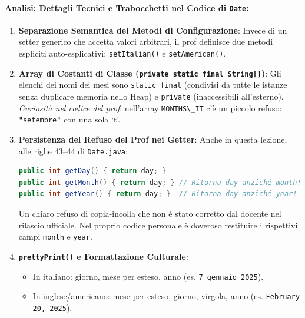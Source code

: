 \documentclass[11pt,a4paper]{article}
\newcommand{\passthrough}[1]{#1}
\providecommand{\tightlist}{\setlength{\itemsep}{0pt}\setlength{\parskip}{0pt}}
\begin{document}
\paragraph{\texorpdfstring{Analisi: Dettagli Tecnici e Trabocchetti nel
Codice di
\texttt{Date}:}{Analisi: Dettagli Tecnici e Trabocchetti nel Codice di Date:}}\label{analisi-dettagli-tecnici-e-trabocchetti-nel-codice-di-date}

\begin{enumerate}
\def\labelenumi{\arabic{enumi}.}
\item
  \textbf{Separazione Semantica dei Metodi di Configurazione}: Invece di
  un setter generico che accetta valori arbitrari, il prof definisce due
  metodi espliciti auto-esplicativi:
  \passthrough{\lstinline!setItalian()!} e
  \passthrough{\lstinline!setAmerican()!}.
\item
  \textbf{Array di Costanti di Classe
  (\passthrough{\lstinline!private static final String[]!})}: Gli
  elenchi dei nomi dei mesi sono \passthrough{\lstinline!static final!}
  (condivisi da tutte le istanze senza duplicare memoria nello Heap) e
  \passthrough{\lstinline!private!} (inaccessibili all'esterno).
  \emph{Curiosità nel codice del prof}: nell'array
  \passthrough{\lstinline!MONTHS\_IT!} c'è un piccolo refuso:
  \passthrough{\lstinline!"setembre"!} con una sola `t'.
\item
  \textbf{Persistenza del Refuso del Prof nei Getter}: Anche in questa
  lezione, alle righe 43--44 di \passthrough{\lstinline!Date.java!}:

\begin{lstlisting}[language=Java]
public int getDay() { return day; }
public int getMonth() { return day; } // Ritorna day anziché month!
public int getYear() { return day; }  // Ritorna day anziché year!
\end{lstlisting}

  Un chiaro refuso di copia-incolla che non è stato corretto dal docente
  nel rilascio ufficiale. Nel proprio codice personale è doveroso
  restituire i rispettivi campi \passthrough{\lstinline!month!} e
  \passthrough{\lstinline!year!}.
\item
  \textbf{\passthrough{\lstinline!prettyPrint()!} e Formattazione
  Culturale}:

  \begin{itemize}
  \tightlist
  \item
    In italiano: giorno, mese per esteso, anno (es.
    \passthrough{\lstinline!7 gennaio 2025!}).
  \item
    In inglese/americano: mese per esteso, giorno, virgola, anno (es.
    \passthrough{\lstinline!February 20, 2025!}).
  \end{itemize}
\end{enumerate}
\end{document}
